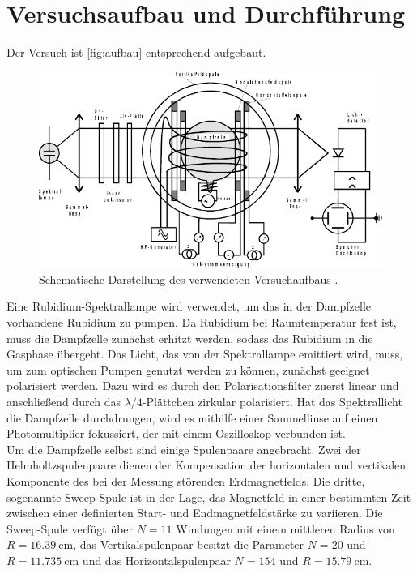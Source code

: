 \section{Versuchsaufbau und Durchführung}
\label{sec:Durchführung}

Der Versuch ist \autoref{fig:aufbau} entsprechend aufgebaut.
\begin{figure}
    \centering
    \includegraphics{figures/Aufbau.pdf}
    \caption{Schematische Darstellung des verwendeten Versuchaufbaus \cite{v21}.}
    \label{fig:aufbau}
\end{figure}

Eine Rubidium-Spektrallampe wird verwendet, um das in der Dampfzelle vorhandene Rubidium zu pumpen.
Da Rubidium bei Raumtemperatur fest ist, muss die Dampfzelle zunächst erhitzt werden, sodass das Rubidium in die Gasphase übergeht.
Das Licht, das von der Spektrallampe emittiert wird, muss, um zum optischen Pumpen genutzt werden zu können, zunächst geeignet polarisiert werden.
Dazu wird es durch den Polarisationsfilter zuerst linear und anschließend durch das $\lambda/4$-Plättchen zirkular polarisiert.
Hat das Spektrallicht die Dampfzelle durchdrungen, wird es mithilfe einer Sammellinse auf einen Photomultiplier fokussiert, der mit einem Oszilloskop verbunden ist.\\

Um die Dampfzelle selbst sind einige Spulenpaare angebracht.
Zwei der Helmholtzspulenpaare dienen der Kompensation der horizontalen und vertikalen Komponente des bei der Messung störenden Erdmagnetfelds.
Die dritte, sogenannte Sweep-Spule ist in der Lage, das Magnetfeld in einer bestimmten Zeit zwischen einer definierten Start- und Endmagnetfeldstärke zu variieren.
Die Sweep-Spule verfügt über $N = 11$ Windungen mit einem mittleren Radius von $R = \SI{16.39}{\centi\meter}$, das Vertikalspulenpaar besitzt die Parameter $N = 20$ und $R = \SI{11.735}{\centi\meter}$ und
das Horizontalspulenpaar $N = 154$ und $R = \SI{15.79}{\centi\meter}$.

